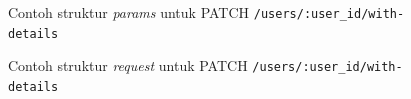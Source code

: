 \begin{figure}
    \centering
    \caption{Contoh struktur \textit{params} untuk PATCH \texttt{/users/{:user\_id}/with-details}}
    \label{fig:params_users_with_details_patch}
\end{figure}
\begin{figure}
    \centering
    \caption{Contoh struktur \textit{request} untuk PATCH \texttt{/users/{:user\_id}/with-details}}
    \label{fig:request_users_with_details_patch}
\end{figure}
